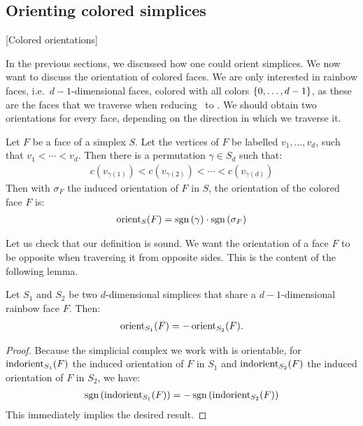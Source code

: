 \subsection{Orienting colored simplices}[Colored orientations]

In the previous sections, we discussed how one could orient simplices. We now want to discuss the orientation of colored faces. We are only interested in rainbow faces, i.e.~$d-1$-dimensional faces, colored with all colors $\left\{0, \dots, d-1\right\}$, as these are the faces that we traverse when reducing \Sperner\ to \EndOfLine. We should obtain two orientations for every face, depending on the direction in which we traverse it.

\begin{definition}
	Let $F$ be a face of a simplex $S$. Let the vertices of $F$ be labelled $v_1, \dots, v_d$, such that $v_1 < \cdots < v_d$. Then there is a permutation $\gamma \in S_d$ such that:
	\begin{align*}
		c(v_{\gamma(1)}) < c(v_{\gamma(2)}) < \cdots < c(v_{\gamma(d)})
	\end{align*}
	Then with $\sigma_F$ the induced orientation of $F$ in $S$, the orientation of the colored face $F$ is:
	\begin{align*}
		\operatorname{orient}_S(F) = \operatorname{sgn}\left(\gamma\right) \cdot \operatorname{sgn}\left(\sigma_F\right)
	\end{align*}
\end{definition}

Let us check that our definition is sound. We want the orientation of a face $F$ to be opposite when traversing it from opposite sides. This is the content of the following lemma.

\begin{lemma}\label{lem:soundness_of_colored_orientability}
	Let $S_1$ and $S_2$ be two $d$-dimensional simplices that share a $d-1$-dimensional rainbow face $F$. Then:
	\begin{align*}
		\operatorname{orient}_{S_1}(F) = - \operatorname{orient}_{S_2}(F).
	\end{align*}
\end{lemma}
\begin{proof}
	Because the simplicial complex we work with is orientable, for $\operatorname{indorient}_{S_1}(F)$ the induced orientation of $F$ in $S_1$ and $\operatorname{indorient}_{S_2}(F)$ the induced orientation of $F$ in $S_2$, we have:
	\begin{align*}
		\operatorname{sgn}\left(\operatorname{indorient}_{S_1}(F)\right) = - \operatorname{sgn}\left(\operatorname{indorient}_{S_2}(F)\right)
	\end{align*}
	This immediately implies the desired result.
\end{proof}

